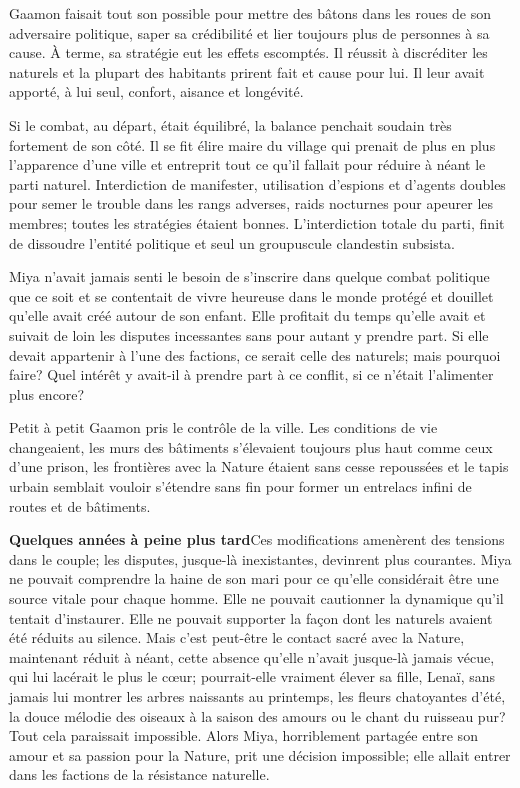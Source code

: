 Gaamon faisait tout son possible pour mettre des bâtons dans les roues de son adversaire politique, saper sa crédibilité et lier toujours plus de personnes à sa cause. À terme, sa stratégie eut les effets escomptés. Il réussit à discréditer les naturels et la plupart des habitants prirent fait et cause pour lui. Il leur avait apporté, à lui seul, confort, aisance et longévité.

Si le combat, au départ, était équilibré, la balance penchait soudain très fortement de son côté. Il se fit élire maire du village qui prenait de plus en plus l'apparence d'une ville et entreprit tout ce qu'il fallait pour réduire à néant le parti naturel. Interdiction de manifester, utilisation d'espions et d'agents doubles pour semer le trouble dans les rangs adverses, raids nocturnes pour apeurer les membres; toutes les stratégies étaient bonnes. L'interdiction totale du parti, finit de dissoudre l'entité politique et seul un groupuscule clandestin subsista.

Miya n'avait jamais senti le besoin de s'inscrire dans quelque combat politique que ce soit et se contentait de vivre heureuse dans le monde protégé et douillet qu'elle avait créé autour de son enfant. Elle profitait du temps qu'elle avait et suivait de loin les disputes incessantes sans pour autant y prendre part. Si elle devait appartenir à l'une des factions, ce serait celle des naturels; mais pourquoi faire? Quel intérêt y avait-il à prendre part à ce conflit, si ce n'était l'alimenter plus encore?

Petit à petit Gaamon pris le contrôle de la ville. Les conditions de vie changeaient, les murs des bâtiments s'élevaient toujours plus haut comme ceux d'une prison, les frontières avec la Nature étaient sans cesse repoussées et le tapis urbain semblait vouloir s'étendre sans fin pour former un entrelacs infini de routes et de bâtiments.

\textbf{Quelques années à peine plus tard}\quad Ces modifications amenèrent des tensions dans le couple; les disputes, jusque-là inexistantes, devinrent plus courantes. Miya ne pouvait comprendre la haine de son mari pour ce qu'elle considérait être une source vitale pour chaque homme. Elle ne pouvait cautionner la dynamique qu'il tentait d'instaurer. Elle ne pouvait supporter la façon dont les naturels avaient été réduits au silence. Mais c'est peut-être le contact sacré avec la Nature, maintenant réduit à néant, cette absence qu'elle n'avait jusque-là jamais vécue, qui lui lacérait le plus le c\oe ur; pourrait-elle vraiment élever sa fille, Lenaï, sans jamais lui montrer les arbres naissants au printemps, les fleurs chatoyantes d'été, la douce mélodie des oiseaux à la saison des amours ou le chant du ruisseau pur? Tout cela paraissait impossible. Alors Miya, horriblement partagée entre son amour et sa passion pour la Nature, prit une décision impossible; elle allait entrer dans les factions de la résistance naturelle.

